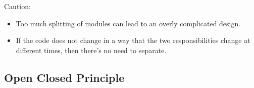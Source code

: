 \documentclass[xcolor=svgnames]{beamer}
\begin{document}

\begin{frame}{\subsecname}

    \begin{minipage}{\columnwidth}
    \end{minipage}

\end{frame}


\begin{frame}{\subsecname}

    \begin{minipage}{\columnwidth}
    \end{minipage}

\end{frame}


\begin{frame}{\subsecname}

    \begin{minipage}{\columnwidth}
    \end{minipage}

\end{frame}


\begin{frame}{\subsecname}
    Caution:
    \begin{itemize}
        \pause \item Too much splitting of modules can lead to an overly
            complicated design.
        \pause \item If the code does not change in a way that the two
            responsibilities change at different times, then there's no need to
            separate.
    \end{itemize}
\end{frame}


\subsection{Open Closed Principle}
\end{document}
